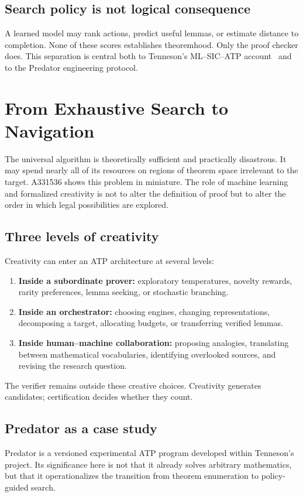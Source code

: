 \documentclass[11pt,oneside]{book}
\theoremstyle{definition}
\theoremstyle{remark}
\begin{document}
\section{Search policy is not logical consequence}
A learned model may rank actions, predict useful lemmas, or estimate distance to completion. None of these scores establishes theoremhood. Only the proof checker does. This separation is central both to Tenneson's ML--SIC--ATP account~\cite{tennesonML} and to the Predator engineering protocol.

\chapter{From Exhaustive Search to Navigation}\label{ch:navigation}
The universal algorithm is theoretically sufficient and practically disastrous. It may spend nearly all of its resources on regions of theorem space irrelevant to the target. A331536 shows this problem in miniature. The role of machine learning and formalized creativity is not to alter the definition of proof but to alter the order in which legal possibilities are explored.

\section{Three levels of creativity}
Creativity can enter an ATP architecture at several levels:
\begin{enumerate}
\item \textbf{Inside a subordinate prover:} exploratory temperatures, novelty rewards, rarity preferences, lemma seeking, or stochastic branching.
\item \textbf{Inside an orchestrator:} choosing engines, changing representations, decomposing a target, allocating budgets, or transferring verified lemmas.
\item \textbf{Inside human--machine collaboration:} proposing analogies, translating between mathematical vocabularies, identifying overlooked sources, and revising the research question.
\end{enumerate}
The verifier remains outside these creative choices. Creativity generates candidates; certification decides whether they count.

\section{Predator as a case study}
Predator is a versioned experimental ATP program developed within Tenneson's project. Its significance here is not that it already solves arbitrary mathematics, but that it operationalizes the transition from theorem enumeration to policy-guided search.
\end{document}
